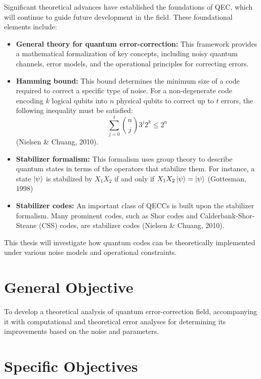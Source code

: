 \documentclass[12pt]{article}
\begin{document}
Significant theoretical advances have established the foundations of QEC, which will continue to guide future development in the field. These foundational elements include:

\begin{itemize}
  \item \textbf{General theory for quantum error-correction:} This framework provides a mathematical formalization of key concepts, including noisy quantum channels, error models, and the operational principles for correcting errors.
  
  \item \textbf{Hamming bound:} This bound determines the minimum size of a code required to correct a specific type of noise. For a non-degenerate code encoding \(k\) logical qubits into \(n\) physical qubits to correct up to \(t\) errors, the following inequality must be satisfied:
  \[
  \sum_{j=0}^{t} \binom{n}{j} 3^j 2^k \le 2^n
  \]
  (Nielsen \& Chuang, 2010).
  
\item \textbf{Stabilizer formalism:} This formalism uses group theory to describe quantum states in terms of the operators that stabilize them. For instance, a state \(\ket{\psi}\) is stabilized by \(X_1X_2\) if and only if \(X_1X_2\ket{\psi} = \ket{\psi}\) (Gottesman, 1998)
  
  \item \textbf{Stabilizer codes:} An important class of QECCs is built upon the stabilizer formalism. Many prominent codes, such as Shor codes and Calderbank-Shor-Steane (CSS) codes, are stabilizer codes (Nielsen \& Chuang, 2010).
\end{itemize}

This thesis will investigate how quantum codes can be theoretically implemented under various noise models and operational constraints.

\section{General Objective}


To develop a theoretical analysis of quantum error-correction field, accompanying it with computational and theoretical error analyses for determining its improvements based on the noise and parameters.

\section{Specific Objectives}
\end{document}
